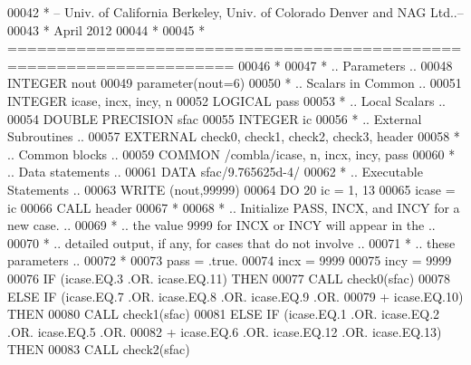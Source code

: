 \begin{DoxyCode}
00042 \textcolor{comment}{*  -- Univ. of California Berkeley, Univ. of Colorado Denver and NAG Ltd..--}
00043 \textcolor{comment}{*     April 2012}
00044 \textcolor{comment}{*}
00045 \textcolor{comment}{*  =====================================================================}
00046 \textcolor{comment}{*}
00047 \textcolor{comment}{*     .. Parameters ..}
00048       \textcolor{keywordtype}{INTEGER}          nout
00049       parameter(nout=6)
00050 \textcolor{comment}{*     .. Scalars in Common ..}
00051       \textcolor{keywordtype}{INTEGER}          icase, incx, incy, n
00052       \textcolor{keywordtype}{LOGICAL}          pass
00053 \textcolor{comment}{*     .. Local Scalars ..}
00054       \textcolor{keywordtype}{DOUBLE PRECISION} sfac
00055       \textcolor{keywordtype}{INTEGER}          ic
00056 \textcolor{comment}{*     .. External Subroutines ..}
00057       \textcolor{keywordtype}{EXTERNAL}         check0, check1, check2, check3, header
00058 \textcolor{comment}{*     .. Common blocks ..}
00059       \textcolor{keyword}{COMMON}           /combla/icase, n, incx, incy, pass
00060 \textcolor{comment}{*     .. Data statements ..}
00061       \textcolor{keyword}{DATA}             sfac/9.765625d-4/
00062 \textcolor{comment}{*     .. Executable Statements ..}
00063       \textcolor{keyword}{WRITE} (nout,99999)
00064       \textcolor{keywordflow}{DO} 20 ic = 1, 13
00065          icase = ic
00066          \textcolor{keyword}{CALL }header
00067 \textcolor{comment}{*}
00068 \textcolor{comment}{*        .. Initialize  PASS,  INCX,  and INCY for a new case. ..}
00069 \textcolor{comment}{*        .. the value 9999 for INCX or INCY will appear in the ..}
00070 \textcolor{comment}{*        .. detailed  output, if any, for cases  that do not involve ..}
00071 \textcolor{comment}{*        .. these parameters ..}
00072 \textcolor{comment}{*}
00073          pass = .true.
00074          incx = 9999
00075          incy = 9999
00076          \textcolor{keywordflow}{IF} (icase.EQ.3 .OR. icase.EQ.11) \textcolor{keywordflow}{THEN}
00077             \textcolor{keyword}{CALL }check0(sfac)
00078          \textcolor{keywordflow}{ELSE} \textcolor{keywordflow}{IF} (icase.EQ.7 .OR. icase.EQ.8 .OR. icase.EQ.9 .OR.
00079      +            icase.EQ.10) \textcolor{keywordflow}{THEN}
00080             \textcolor{keyword}{CALL }check1(sfac)
00081          \textcolor{keywordflow}{ELSE} \textcolor{keywordflow}{IF} (icase.EQ.1 .OR. icase.EQ.2 .OR. icase.EQ.5 .OR.
00082      +            icase.EQ.6 .OR. icase.EQ.12 .OR. icase.EQ.13) \textcolor{keywordflow}{THEN}
00083             \textcolor{keyword}{CALL }check2(sfac)

\end{DoxyCode}
